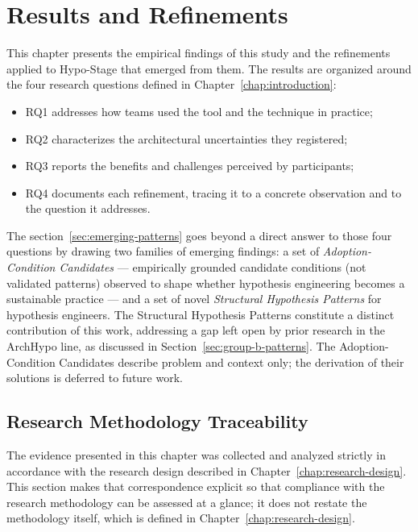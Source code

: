 \chapter{Results and Refinements}
\label{chap:results}
\label{ch:results}

This chapter presents the empirical findings of this study and the refinements applied to
Hypo-Stage that emerged from them. The results are organized around the four
research questions defined in Chapter~\ref{chap:introduction}: 
\begin{itemize}
  \item RQ1 addresses how teams used the tool and the technique in practice;
  \item RQ2 characterizes the architectural uncertainties they registered;
  \item RQ3 reports the benefits and challenges perceived by participants;
  \item RQ4 documents each refinement, tracing it to a concrete observation and to the question it addresses.
\end{itemize}

The section~\ref{sec:emerging-patterns} goes beyond a direct answer to those four
questions by drawing two families of emerging findings: a set of
\textit{Adoption-Condition Candidates} --- empirically grounded candidate
conditions (not validated patterns) observed to shape whether hypothesis
engineering becomes a sustainable practice --- and a set of novel
\textit{Structural Hypothesis Patterns} for hypothesis engineers. The Structural
Hypothesis Patterns constitute a distinct contribution of this work, addressing a
gap left open by prior research in the ArchHypo line, as discussed in
Section~\ref{sec:group-b-patterns}. The Adoption-Condition Candidates describe
problem and context only; the derivation of their solutions is deferred to future
work.

\section{Research Methodology Traceability}
\label{sec:methodology-traceability}

The evidence presented in this chapter was collected and analyzed strictly in
accordance with the research design described in Chapter~\ref{chap:research-design}.
This section makes that correspondence explicit so that compliance with the
research methodology can be assessed at a glance; it does not restate the
methodology itself, which is defined in Chapter~\ref{chap:research-design}.

